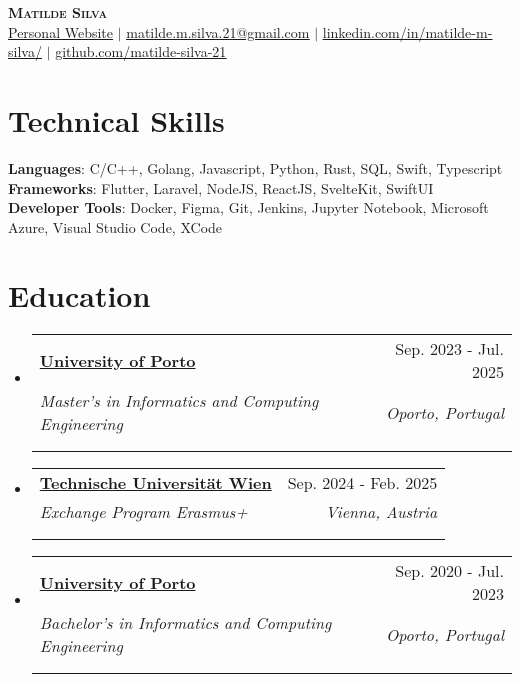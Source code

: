 \documentclass[letterpaper,11pt]{article}
\makeatletter
\newcommand{\resumeSubheading}[5]{
  \vspace{-2pt}\item
    \begin{tabular*}{0.97\textwidth}[t]{l@{\extracolsep{\fill}}r}
      \textbf{#1} & #2 \\
      \textit{\small#3} & \textit{\small #4} \\
      \if\relax\detokenize{#5}\relax
      \else
        \multicolumn{2}{@{}l}{\textit{\small#5}} \\
      \fi
    \end{tabular*}\vspace{-7pt}
}
\newcommand{\resumeSubHeadingListStart}{\begin{itemize}[leftmargin=0.15in, label={}]}
\newcommand{\resumeSubHeadingListEnd}{\end{itemize}}
\makeatother
\begin{document}

\begin{center}
    \textbf{\Huge \scshape Matilde Silva} \\ \vspace{10pt}
    \small \href{https://matilde-silva-21.github.io/}{\uline{Personal Website}} $|$ \href{mailto:x@x.com}{\uline{matilde.m.silva.21@gmail.com}} $|$ 
    \href{https://www.linkedin.com/in/matilde-m-silva/}{\uline{linkedin.com/in/matilde-m-silva/}} $|$
    \href{https://github.com/matilde-silva-21}{\uline{github.com/matilde-silva-21}}
\end{center}


\section{Technical Skills}
 \begin{itemize}[leftmargin=0.15in, label={}]
    \small{\item{
     \textbf{Languages}{: C/C++, Golang, Javascript, Python, Rust, SQL, Swift, Typescript} \\
     \textbf{Frameworks}{: Flutter, Laravel, NodeJS, ReactJS, SvelteKit, SwiftUI} \\
     \textbf{Developer Tools}{: Docker, Figma, Git, Jenkins, Jupyter Notebook, Microsoft Azure, Visual Studio Code, XCode}
    }}
 \end{itemize}

\section{Education}
  \resumeSubHeadingListStart
      \resumeSubheading
      {\href{https://sigarra.up.pt/feup/en/WEB_PAGE.INICIAL}{University of Porto}}{Sep. 2023 - Jul. 2025}
      {Master’s in Informatics and Computing Engineering}{Oporto, Portugal}
      {Current Grade: 16/20}
    \resumeSubheading
      {\href{https://informatics.tuwien.ac.at/}{Technische Universität Wien}}{Sep. 2024 - Feb. 2025}
      {Exchange Program Erasmus+}{Vienna, Austria}
      {}
    \resumeSubheading
      {\href{https://sigarra.up.pt/feup/en/WEB_PAGE.INICIAL}{University of Porto}}{Sep. 2020 - Jul. 2023}
      {Bachelor’s in Informatics and Computing Engineering}{Oporto, Portugal}
      {Final Grade: 15/20}
  \resumeSubHeadingListEnd
\leavevmode \\ %
\end{document}
